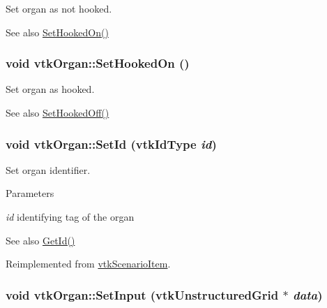 Set organ as not hooked. \begin{DoxySeeAlso}{See also}
\hyperlink{classvtkOrgan_a78a3cdaeb7e6b23de0880dcb1c407cfe}{SetHookedOn()} 
\end{DoxySeeAlso}
\hypertarget{classvtkOrgan_a78a3cdaeb7e6b23de0880dcb1c407cfe}{
\subsubsection[{SetHookedOn}]{\setlength{\rightskip}{0pt plus 5cm}void vtkOrgan::SetHookedOn ()}}
\label{classvtkOrgan_a78a3cdaeb7e6b23de0880dcb1c407cfe}


Set organ as hooked. \begin{DoxySeeAlso}{See also}
\hyperlink{classvtkOrgan_ad2ac78a6020fba61ff49edad8a3f6a22}{SetHookedOff()} 
\end{DoxySeeAlso}
\hypertarget{classvtkOrgan_a0aab831b4e0a9d33ba961a0907b73e80}{
\subsubsection[{SetId}]{\setlength{\rightskip}{0pt plus 5cm}void vtkOrgan::SetId (vtkIdType {\em id})}}
\label{classvtkOrgan_a0aab831b4e0a9d33ba961a0907b73e80}


Set organ identifier. 
\begin{DoxyParams}{Parameters}
\item[{\em id}]identifying tag of the organ \end{DoxyParams}
\begin{DoxySeeAlso}{See also}
\hyperlink{classvtkOrgan_a8e45f79da9c4e7029492ced2f55c25ed}{GetId()} 
\end{DoxySeeAlso}


Reimplemented from \hyperlink{classvtkScenarioItem_afd99a6db7187837d0129e9898478ec60}{vtkScenarioItem}.\hypertarget{classvtkOrgan_abfe750f8e4ec9bbd0b9f182894bf2c97}{
\subsubsection[{SetInput}]{\setlength{\rightskip}{0pt plus 5cm}void vtkOrgan::SetInput (vtkUnstructuredGrid $\ast$ {\em data})}}
\label{classvtkOrgan_abfe750f8e4ec9bbd0b9f182894bf2c97}


